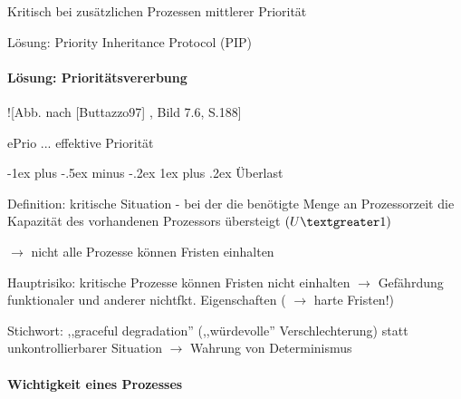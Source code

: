 \documentclass[a4paper]{article}
\makeatletter
\renewcommand{\subsubsection}{\@startsection{subsubsection}{3}{0mm}%
 {-1ex plus -.5ex minus -.2ex}%
 {1ex plus .2ex}%
 {\normalfont\small\bfseries}}
\makeatother
\begin{document}
\begin{multicols}{3}
    \begin{itemize*}
        \item Kritisch bei zusätzlichen Prozessen mittlerer Priorität
        \item Lösung: Priority Inheritance Protocol (PIP)
    \end{itemize*}


    \paragraph{Lösung:
        Prioritätsvererbung}

    \begin{itemize*}
        \item ![Abb. nach [Buttazzo97] , Bild 7.6, S.188]
        \item ePrio ... effektive Priorität
    \end{itemize*}


    \subsubsection{Überlast}

    \begin{itemize*}
        \item Definition: kritische Situation - bei der die benötigte Menge an
        Prozessorzeit die Kapazität des vorhandenen Prozessors übersteigt
        $(U\textgreater1)$
        \begin{itemize*}
            \item[$\rightarrow$] nicht alle Prozesse können Fristen einhalten
        \end{itemize*}
        \item Hauptrisiko: kritische Prozesse können Fristen nicht einhalten
        $\rightarrow$ Gefährdung funktionaler und anderer
        nichtfkt. Eigenschaften ( $\rightarrow$ harte Fristen!)
        \item Stichwort: ,,graceful degradation'' (,,würdevolle'' Verschlechterung)
        statt unkontrollierbarer Situation $\rightarrow$
        Wahrung von Determinismus
    \end{itemize*}


    \paragraph{Wichtigkeit eines
        Prozesses}


\end{multicols}
\end{document}
